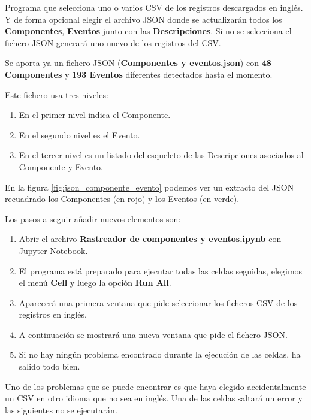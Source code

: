 Programa que selecciona uno o varios CSV de los registros descargados en inglés. Y de forma opcional elegir el archivo JSON donde se actualizarán todos los \textbf{Componentes}, \textbf{Eventos} junto con las \textbf{Descripciones}. Si no se selecciona el fichero JSON generará uno nuevo de los registros del CSV.

Se aporta ya un fichero JSON (\textbf{Componentes y eventos.json}) con \textbf{48 Componentes} y \textbf{193 Eventos} diferentes detectados hasta el momento. 

Este fichero usa tres niveles:
\begin{enumerate}
	\item En el primer nivel indica el Componente.
	\item En el segundo nivel es el Evento.
	\item En el tercer nivel es un listado del esqueleto de las Descripciones asociados al Componente y Evento.
\end{enumerate}

En la figura \ref{fig:json_componente_evento} podemos ver un extracto del JSON recuadrado los Componentes (en rojo) y los Eventos (en verde).


Los pasos a seguir añadir nuevos elementos son:

\begin{enumerate}
	\item Abrir el archivo \textbf{Rastreador de componentes y eventos.ipynb} con Jupyter Notebook.
	\item El programa está preparado para ejecutar todas las celdas seguidas, elegimos el menú \textbf{Cell} y luego la opción \textbf{Run All}.
	\item Aparecerá una primera ventana que pide seleccionar los ficheros CSV de los registros en inglés.
	\item A continuación se mostrará una nueva ventana que pide el fichero JSON.
	\item Si no hay ningún problema encontrado durante la ejecución de las celdas, ha salido todo bien. 
\end{enumerate}

Uno de los problemas que se puede encontrar es que haya elegido accidentalmente un CSV en otro idioma que no sea en inglés. Una de las celdas saltará un error y las siguientes no se ejecutarán.

